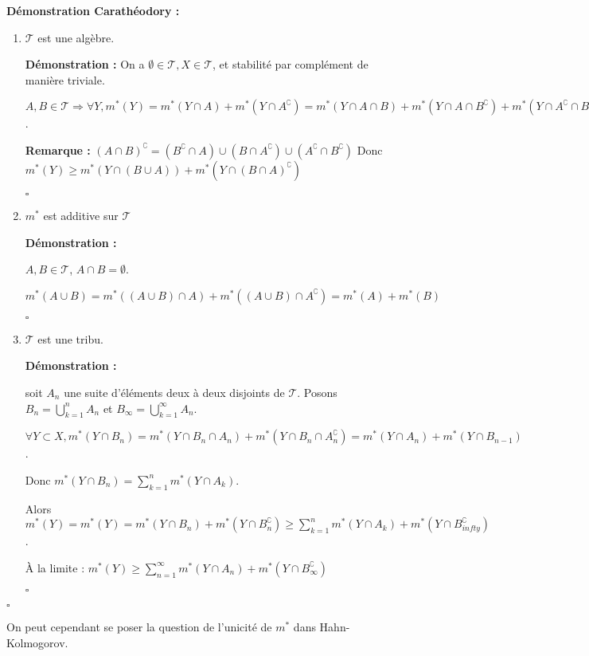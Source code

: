 \documentclass[10pt,a4paper,notitlepage ]{report}
\newcommand{\1}{\mathds 1}
\newcommand{\comp}[1]{#1^\complement}
\newcounter{th}
\newenvironment{demo}[1][]{

	\textbf{Démonstration #1 :}
}{\begin{flushright}
	$\square$
\end{flushright}
}
\newenvironment{rem}{
	
		\textbf{Remarque :}}{}
\begin{document}
\begin{demo}[Carathéodory]
	
	\begin{enumerate}
		\item $\mathcal T$ est une algèbre. 
		\begin{demo} On a $\emptyset \in \mathcal T, X \in \mathcal T$, et stabilité par complément de manière triviale.
		
		$A,B \in \mathcal T \Rightarrow \forall Y, m^*(Y) = m^*(Y\cap A) + m^*(Y \cap \comp A) = m^*(Y \cap A \cap B) + m^*(Y \cap A \cap \comp B) + m^*(Y \cap \comp A \cap \comp B) + m^*(Y \cap \comp A \cap B)$.
		
		\begin{rem}
			$\comp{(A \cap B)} = (\comp B \cap A) \cup (B \cap \comp A) \cup (\comp A \cap \comp B)$
		\end{rem}
		Donc $m^*(Y) \ge m^*(Y \cap (B \cup A)) + m^*(Y \cap \comp{(B \cap A)})$
		\end{demo}
		\item $m^*$ est additive sur $\mathcal T$
		\begin{demo}
			$A,B \in \mathcal T$, $A\cap B = \emptyset$.
			
			$m^*(A\cup B) = m^*((A\cup B)\cap A) + m^*((A \cup B) \cap \comp A) = m^*(A) + m^*(B)$
		\end{demo}
		\item $\mathcal T$ est une tribu.
		\begin{demo}
			soit $A_n$ une suite d'éléments deux à deux disjoints de $\mathcal T$. Posons $B_n =\bigcup_{k=1}^n A_n$ et $B_\infty = \bigcup_{k=1}^\infty A_n$.
			
			$\forall Y \subset X, m^*(Y \cap B_n) = m^*(Y \cap B_n \cap A_n) + m^*(Y \cap B_n \cap \comp{A_n}) = m^*(Y \cap A_n) + m^*(Y \cap B_{n-1})$.
			
			Donc $m^*(Y\cap B_n) = \sum_{k=1}^n m^*(Y \cap A_k)$.
			
			Alors $m^*(Y) = m^*(Y) = m^*(Y \cap B_n) + m^*(Y \cap \comp{B_n}) \ge \sum_{k=1}^n m^*(Y \cap A_k) + m^*(Y \cap \comp{B_{infty}})$.
			
			À la limite : $m^*(Y) \ge \sum_{n=1}^\infty m^*(Y \cap A_n) + m^*(Y \cap \comp{B_{\infty}})$
		\end{demo}
	\end{enumerate}
\end{demo}

On peut cependant se poser la question de l'unicité de $m^*$ dans Hahn-Kolmogorov.
\end{document}
